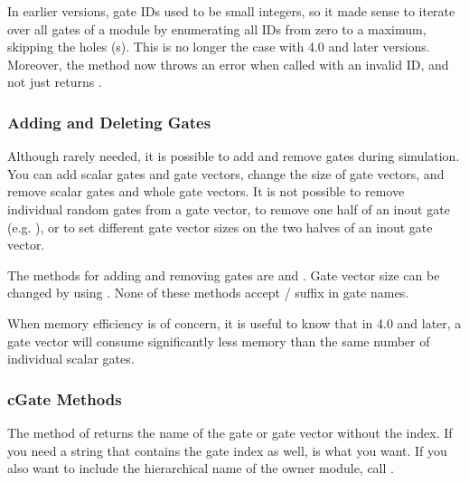 \begin{ned}
\begin{note}
    In earlier {\opp} versions, gate IDs used to be small integers, so
    it made sense to iterate over all gates of a module by enumerating
    all IDs from zero to a maximum, skipping the holes (s).
    This is no longer the case with {\opp} 4.0 and later versions.
    Moreover, the  method now throws an error when called
    with an invalid ID, and not just returns .
\end{note}


\subsubsection{Adding and Deleting Gates}
\label{sec:simple-modules:adding-and-deleting-gates}

Although rarely needed, it is possible to add and remove gates during
simulation. You can add scalar gates and gate vectors, change the size of
gate vectors, and remove scalar gates and whole gate vectors.
It is not possible to remove individual random gates from a gate vector,
to remove one half of an inout gate (e.g. ), or to set
different gate vector sizes on the two halves of an inout gate vector.

The  methods for adding and removing gates are
 and .
Gate vector size can be changed by using .
None of these methods accept  /  suffix in gate names.

\begin{note}
    When memory efficiency is of concern, it is useful to know that
    in {\opp} 4.0 and later, a gate vector will consume significantly less
    memory than the same number of individual scalar gates.
\end{note}


\subsubsection{cGate Methods}
\label{sec:simple-modules:cgate-methods}

The  method of  returns the name of the
gate or gate vector without the index. If you need a string that contains the gate index
as well,  is what you want. If you also want to
include the hierarchical name of the owner module, call .


\end{ned}

